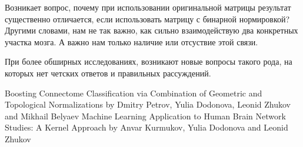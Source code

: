 \documentclass{urticle}
\begin{document}
Возникает вопрос, почему при использовании оригинальной матрицы результат существенно отличается, если использовать матрицу с бинарной нормировкой? Другими словами, нам не так важно, как сильно взаимодействую два конкретных участка мозга. А важно нам только наличие или отсуствие этой связи.

При более обширных исследованиях, возникают новые вопросы такого рода, на которых нет четских ответов и правильных рассуждений.

\begin{thebibliography}{2}
 Boosting Connectome Classification via Combination of Geometric and Topological Normalizations by Dmitry Petrov, Yulia Dodonova, Leonid Zhukov and Mikhail Belyaev
 Machine Learning Application to Human Brain Network Studies: A Kernel Approach by Anvar Kurmukov, Yulia Dodonova and Leonid Zhukov 
\end{thebibliography}
\end{document}

